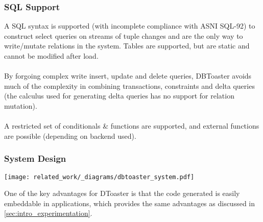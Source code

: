 \subsubsection{SQL Support}
A SQL syntax is supported (with incomplete compliance with ASNI SQL-92) to construct select queries
on streams\cite{DBToasterSQLReference} of tuple changes and are the only way to write/mutate relations in the system.
Tables are supported, but are static and cannot be modified after load.
\\
\\ By forgoing complex write insert, update and delete queries, DBToaster avoids much of the complexity in combining
transactions, constraints and delta queries (the calculus used for generating delta queries has no support for
relation mutation).
\\
\\ A restricted set of conditionals \& functions are supported, and external functions are possible (depending on backend used).

\subsubsection{System Design}
\begin{center}
    \texttt{[image: related\_work/\_diagrams/dbtoaster\_system.pdf]}
\end{center}
One of the key advantages for DToaster is that the code generated is easily embeddable in applications, which provides the same advantages as discussed in \ref{sec:intro_experimentation}.

